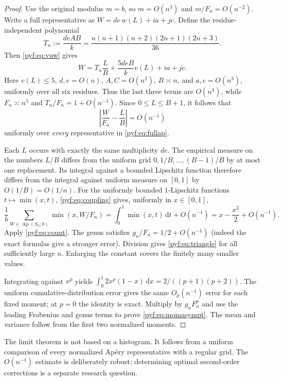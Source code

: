 \documentclass[11pt,a4paper]{article}
\numberwithin{equation}{section}
\theoremstyle{definition}
\newcommand{\Ap}{\operatorname{Ap}}
\newcommand{\dd}{\,\mathrm d}
\begin{document}
\begin{proof}
Use the original modulus $m=b$, so $m=O(n^3)$ and
$m/F_n=O(n^{-2})$. Write a full representative as
$W=de\,w(L)+ia+jc$. Define the residue-independent polynomial
\begin{equation}\label{pyf:eq:Tscale}
T_n:=\frac{deAB}{k}
=\frac{n(n+1)(n+2)(2n+1)(2n+3)}{36}.
\end{equation}
Then \eqref{pyf:eq:vuw} gives
\[
W=T_n\frac LB+\frac{5deB}{k}v(L)+ia+jc.
\]
Here $v(L)\leq5$, $d,e=O(n)$, $A,C=O(n^2)$,
$B\asymp n$, and $a,c=O(n^3)$, uniformly over all six residues.
Thus the last three terms are $O(n^4)$, while
$F_n\asymp n^5$ and $T_n/F_n=1+O(n^{-1})$. Since
$0\leq L\leq B+1$, it follows that
\begin{equation}\label{pyf:eq:coupling}
\left|\frac W{F_n}-\frac LB\right|=O(n^{-1})
\end{equation}
uniformly over \emph{every} representative in \eqref{pyf:eq:fullap}.

Each $L$ occurs with exactly the same multiplicity $de$. The empirical
measure on the numbers $L/B$ differs from the uniform grid
$0,1/B,\ldots,(B-1)/B$ by at most one replacement. Its integral against a
bounded Lipschitz function therefore differs from the integral against
uniform measure on $[0,1]$ by $O(1/B)=O(1/n)$.
For the uniformly bounded $1$-Lipschitz functions $t\mapsto\min(x,t)$,
\eqref{pyf:eq:coupling} gives, uniformly in $x\in[0,1]$,
\begin{equation}\label{pyf:eq:minlimit}
\frac1b\sum_{W\in\Ap(S_n;b)}\min(x,W/F_n)
=\int_0^1\min(x,t)\dd t+O(n^{-1})
=x-\frac{x^2}{2}+O(n^{-1}).
\end{equation}
Apply \eqref{pyf:eq:count}. The genus satisfies
$g_n/F_n=1/2+O(n^{-1})$ (indeed the exact formulas give a stronger error).
Division gives \eqref{pyf:eq:triangle} for all sufficiently large $n$.
Enlarging the constant covers the finitely many smaller values.

Integrating against $x^p$ yields
$\int_0^1 2x^p(1-x)\dd x=2/((p+1)(p+2))$.
The uniform cumulative-distribution error gives the same $O_p(n^{-1})$
error for each fixed moment; at $p=0$ the identity is exact. Multiply by
$g_nF_n^p$ and use the leading Frobenius and genus terms to prove
\eqref{pyf:eq:momasympt}. The mean and variance follow from the first two
normalized moments.
\end{proof}

The limit theorem is not based on a histogram. It follows from a uniform
comparison of every normalized Ap\'ery representative with a regular grid.
The $O(n^{-1})$ estimate is deliberately robust; determining optimal
second-order corrections is a separate research question.
\end{document}
